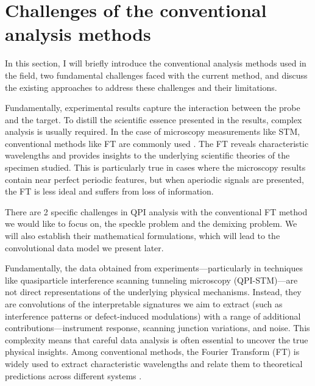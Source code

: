\section{Challenges of the conventional analysis methods}
In this section, I will briefly introduce the conventional analysis methods used in the field, two fundamental challenges faced with the current method, and discuss the existing approaches to address these challenges and their limitations. 

Fundamentally, experimental results capture the interaction between the probe and the target. To distill the scientific essence presented in the results, complex analysis is usually required. In the case of microscopy measurements like STM, conventional methods like \ac{FT} are commonly used \cite{ardiniHighthroughputMultimodalWidefield2023}\cite{jaffeDifferenceFourierAnalysis1987}
\noindent \cite{sciuttoFTNIRMicroscopyAdvanced2014}\cite{kimotoAssessmentLowervoltageTEM2012}. The \ac{FT} reveals characteristic wavelengths and provides insights to the underlying scientific theories of the specimen studied. This is particularly true in cases where the microscopy results contain near perfect periodic features, but when aperiodic signals are presented, the \ac{FT} is less ideal and suffers from loss of information. 

There are 2 specific challenges in QPI analysis with the conventional \ac{FT} method we would like to focus on, the speckle problem and the demixing problem. We will also establish their mathematical formulations, which will lead to the convolutional data model we present later. 

Fundamentally, the data obtained from experiments—particularly in techniques like quasiparticle interference scanning tunneling microscopy (QPI-STM)—are not direct representations of the underlying physical mechanisms. Instead, they are convolutions of the interpretable signatures we aim to extract (such as interference patterns or defect-induced modulations) with a range of additional contributions—instrument response, scanning junction variations, and noise. This complexity means that careful data analysis is often essential to uncover the true physical insights. Among conventional methods, the Fourier Transform (FT) is widely used to extract characteristic wavelengths and relate them to theoretical predictions across different systems \cite{ardiniHighthroughputMultimodalWidefield2023}\cite{jaffeDifferenceFourierAnalysis1987}
\noindent \cite{sciuttoFTNIRMicroscopyAdvanced2014}\cite{kimotoAssessmentLowervoltageTEM2012}.

